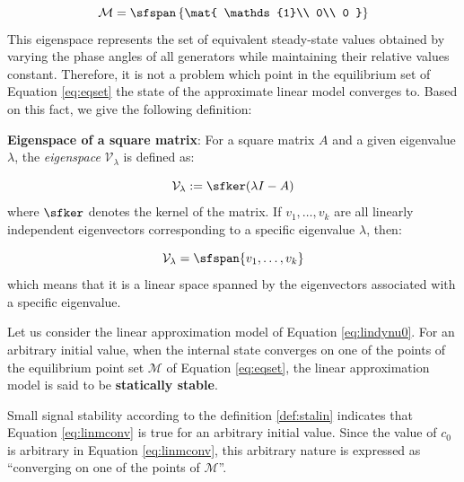 \documentclass[graybox, envcountchap]{svmult}
\begin{document}
\begin{equation}\label{eq:eqset}
  \mathcal{M} =
  \sfspan\left\{
  \mat{
  \mathds{1}\\
  0\\
  0
  }
  \right\}
\end{equation}
This eigenspace represents the set of equivalent steady-state values obtained by
varying the phase angles of all generators while maintaining their relative
values constant. Therefore, it is not a problem which point in the equilibrium
set of Equation \ref{eq:eqset} the state of the approximate linear model
converges to. Based on this fact, we give the following definition:

\begin{COLUMN}
\noindent \textbf{Eigenspace of a square matrix}:
For a square matrix $A$ and a given eigenvalue $\lambda$, the \emph{eigenspace}
 $\mathcal{V}_{\lambda}$ is defined as:

\[
  \mathcal{V}_{\lambda}:= \sfker (\lambda I -A)
\]
where $\sfker$ denotes the kernel of the matrix. If $v_1,\ldots,v_k$ are all
linearly independent eigenvectors corresponding to a specific eigenvalue
$\lambda$, then:

\[
\mathcal{V}_{\lambda} = \sfspan\{v_1,\ldots,v_k\}
\]
which means that it is a linear space spanned by the eigenvectors associated
with a specific eigenvalue.

\end{COLUMN}


\begin{definition}
\label{def:stalin}
Let us consider the linear approximation model of Equation \ref{eq:lindynu0}.
For an arbitrary initial value, when the internal state converges on one of the points of the equilibrium point set $\mathcal{M}$ of Equation \ref{eq:eqset}, the linear approximation model is said to be \textbf{statically stable}.
\end{definition}
Small signal stability according to the definition \ref{def:stalin} indicates that Equation \ref{eq:linmconv} is true for an arbitrary initial value.
Since the value of $c_0$ is arbitrary in Equation \ref{eq:linmconv}, this arbitrary nature is expressed as “converging on one of the points of $\mathcal{M}$”.
\end{document}
